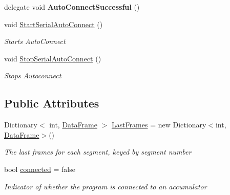 \begin{DoxyCompactItemize}
\mbox{\label{class_accumulator_monitor_m017_1_1_backend_1_1_accumulator_interface_ab835e96ddab837e6c0c2ae2d7b010440}} 
delegate void {\bfseries Auto\+Connect\+Successful} ()
\item 
void \hyperlink{class_accumulator_monitor_m017_1_1_backend_1_1_accumulator_interface_a4cffc3e2a4c4edd1279e06dd58d9bdae}{Start\+Serial\+Auto\+Connect} ()
\begin{DoxyCompactList}\small\item\em Starts Auto\+Connect \end{DoxyCompactList}\item 
void \hyperlink{class_accumulator_monitor_m017_1_1_backend_1_1_accumulator_interface_a5dc28aa24e78d6997948b8c7163bac32}{Stop\+Serial\+Auto\+Connect} ()
\begin{DoxyCompactList}\small\item\em Stops Autoconnect \end{DoxyCompactList}\end{DoxyCompactItemize}
\subsection*{Public Attributes}
\begin{DoxyCompactItemize}
\item 
Dictionary$<$ int, \hyperlink{class_accumulator_monitor_m017_1_1_backend_1_1_data_frame}{Data\+Frame} $>$ \hyperlink{class_accumulator_monitor_m017_1_1_backend_1_1_accumulator_interface_a3a410de91112d620ab24f86795aaea60}{Last\+Frames} = new Dictionary$<$int, \hyperlink{class_accumulator_monitor_m017_1_1_backend_1_1_data_frame}{Data\+Frame}$>$()
\begin{DoxyCompactList}\small\item\em The last frames for each segment, keyed by segment number \end{DoxyCompactList}\item 
bool \hyperlink{class_accumulator_monitor_m017_1_1_backend_1_1_accumulator_interface_ac1a1bd028a8e692f0c7c24a2db943e97}{connected} = false
\begin{DoxyCompactList}\small\item\em Indicator of whether the program is connected to an accumulator \end{DoxyCompactList}\end{DoxyCompactItemize}
